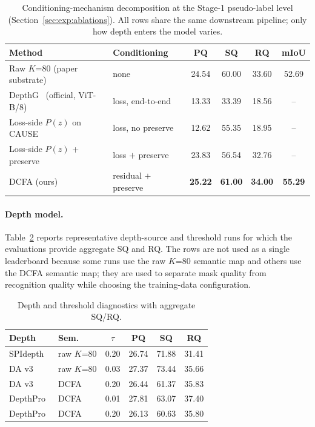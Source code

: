 \documentclass[10pt,twocolumn,letterpaper]{article}
\begin{document}
\begin{table}[t]
\centering
\scriptsize
\setlength{\tabcolsep}{3pt}
\begin{tabular}{@{}l l c c c c@{}}
\toprule
Method & Conditioning & PQ & SQ & RQ & mIoU \\
\midrule
Raw $K$=80 (paper substrate)        & none                  & 24.54 & 60.00 & 33.60 & 52.69 \\
DepthG~\cite{sick2024depthg} (official, ViT-B/8)          & loss, end-to-end      & 13.33 & 33.39 & 18.56 & -- \\
Loss-side $P(z)$ on CAUSE~\cite{kim2024cause}           & loss, no preserve     & 12.62 & 55.35 & 18.95 & -- \\
Loss-side $P(z)$ + preserve         & loss $+$ preserve     & 23.83 & 56.54 & 32.76 & -- \\
DCFA (ours)                         & residual $+$ preserve & \textbf{25.22} & \textbf{61.00} & \textbf{34.00} & \textbf{55.29} \\
\bottomrule
\end{tabular}
\caption{Conditioning-mechanism decomposition at the Stage-1 pseudo-label level (Section~\ref{sec:exp:ablations}). All rows share the same downstream pipeline; only how depth enters the model varies.}
\label{tab:conditioning}
\end{table}

\paragraph{Depth model.}
Table~\ref{tab:depth} reports representative depth-source and threshold runs for which the evaluations provide aggregate SQ and RQ. The rows are not used as a single leaderboard because some runs use the raw $K$=80 semantic map and others use the DCFA semantic map; they are used to separate mask quality from recognition quality while choosing the training-data configuration.

\begin{table}[t]
\centering
\small
\setlength{\tabcolsep}{3pt}
\begin{tabular}{l l c c c c}
\toprule
Depth & Sem. & $\tau$ & PQ & SQ & RQ \\
\midrule
SPIdepth & raw $K$=80 & 0.20 & 26.74 & 71.88 & 31.41 \\
DA v3~\cite{lin2025da3} & raw $K$=80 & 0.03 & 27.37 & 73.44 & 35.66 \\
DA v3~\cite{lin2025da3} & DCFA & 0.20 & 26.44 & 61.37 & 35.83 \\
DepthPro~\cite{bochkovskii2024depthpro} & DCFA & 0.01 & 27.81 & 63.07 & 37.40 \\
DepthPro~\cite{bochkovskii2024depthpro} & DCFA & 0.20 & 26.13 & 60.63 & 35.80 \\
\bottomrule
\end{tabular}
\caption{Depth and threshold diagnostics with aggregate SQ/RQ.}
\label{tab:depth}
\end{table}
\end{document}
